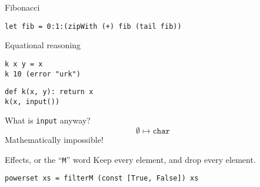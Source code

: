 \documentclass[8pt]{beamer}
\begin{document}
\begin{frame}[fragile]{Fibonacci}
\begin{verbatim}
let fib = 0:1:(zipWith (+) fib (tail fib))
\end{verbatim}
\end{frame}


\begin{frame}[fragile]{Equational reasoning}
\begin{verbatim}
k x y = x
k 10 (error "urk")
\end{verbatim}


\begin{verbatim}
def k(x, y): return x
k(x, input())
\end{verbatim}
\end{frame}


\begin{frame}[fragile]{What is \texttt{input} anyway?}
$$\emptyset \mapsto \texttt{char} $$
Mathematically impossible!
\end{frame}

\begin{frame}[fragile]{Effects, or the ``\texttt{M}'' word}
Keep every element, and drop every element.
\begin{verbatim}
powerset xs = filterM (const [True, False]) xs
\end{verbatim}
\end{frame}
\end{document}
